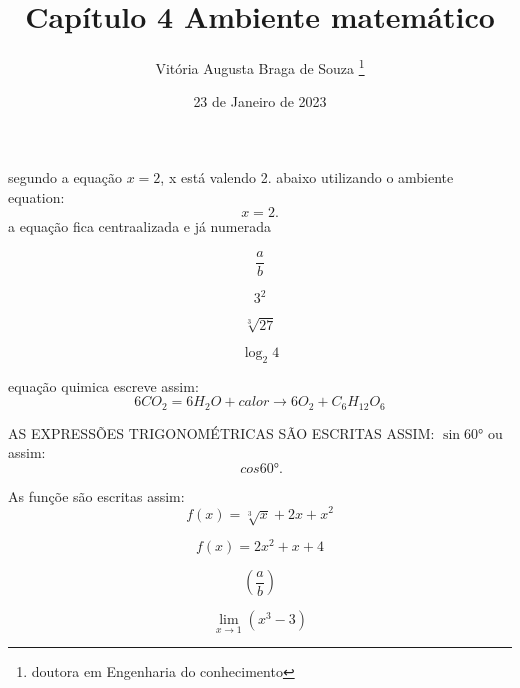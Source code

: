 \documentclass[12pt, a4paper, oneside]{article}
\begin{document}
\title{Capítulo 4 Ambiente matemático}
\author{Vitória Augusta Braga de Souza \footnote{doutora em Engenharia do conhecimento}}
\date{23 de Janeiro de 2023}
\maketitle %

segundo a equação $ x=2 $, x está valendo 2.
abaixo utilizando o ambiente equation: 
\begin{equation}
x=2.
\end{equation}
 a equação fica centraalizada e já numerada
 
 \begin{equation}
 \frac{a}{b}
 \end{equation}
 
 \begin{equation}
 3^{2}
 \end{equation}
 
 \begin{equation}
 \sqrt[3]{27}
 \end{equation}
 
 \begin{equation}
 \log_{2} 4
 \end{equation}
 
 equação quimica escreve assim:
 \begin{equation}
 6 CO_{2} = 6 H_{2}O + calor \rightarrow 6 O_{2} + C_{6}H_{12}O_6
 \end{equation}
 
 AS EXPRESSÕES TRIGONOMÉTRICAS SÃO ESCRITAS ASSIM:
 $\sin 60°$
 ou assim:
\begin{equation}
\ cos 60°.
\end{equation}

As funçõe são escritas assim:
\begin{equation}
f(x)=\sqrt[3]{x} + 2x + x^{2} 
\end{equation}

\begin{equation}
f(x)= 2x^{2} + x + 4
\end{equation}

\begin{equation}
\left( \frac{a}{b}\right) 
\end{equation}


\begin{equation}
\lim_{x\rightarrow 1}(x^{3}- 3)
\end{equation}
\end{document}
